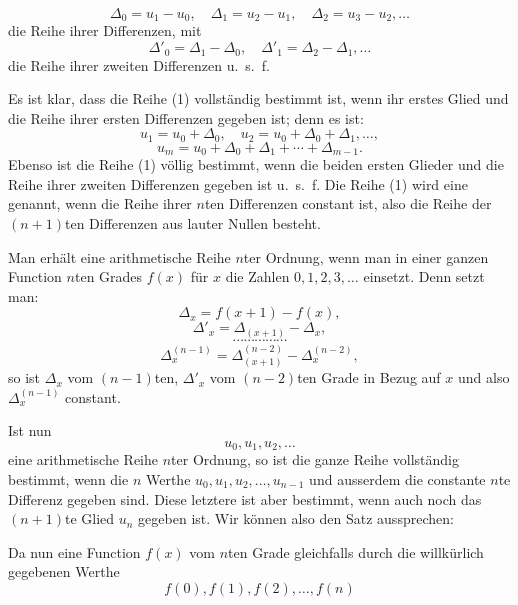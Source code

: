
\begin{equation}
\Delta_0=u_1-u_0,\quad
\Delta_1=u_2-u_1,\quad
\Delta_2=u_3-u_2,\ldots
\tag{2}
\end{equation}
die Reihe ihrer Differenzen, mit
\begin{equation}
\Delta'_0=\Delta_1-\Delta_0,\quad
\Delta'_1=\Delta_2-\Delta_1,\ldots
\tag{3}
\end{equation}
die Reihe ihrer zweiten Differenzen u.\ s.\ f.

Es ist klar, dass die Reihe (1) vollständig bestimmt ist, wenn ihr erstes Glied und die Reihe ihrer ersten Differenzen gegeben ist; denn es ist:
\[
u_1=u_0+\Delta_0,\quad
u_2=u_0+\Delta_0+\Delta_1,\ldots,
\]
\[
u_m=u_0+\Delta_0+\Delta_1+\cdots+\Delta_{m-1}.
\]
Ebenso ist die Reihe (1) völlig bestimmt, wenn die beiden ersten Glieder und die Reihe ihrer zweiten Differenzen gegeben ist u.\ s.\ f. Die Reihe (1) wird eine  genannt, wenn die Reihe ihrer $n$ten Differenzen constant ist, also die Reihe der $(n+1)$ten Differenzen aus lauter Nullen besteht.

Man erhält eine arithmetische Reihe $n$ter Ordnung, wenn man in einer ganzen Function $n$ten Grades $f(x)$ für $x$ die Zahlen $0,1,2,3,\ldots$ einsetzt. Denn setzt man:
\[
\Delta_x=f(x+1)-f(x),
\]
\[
\Delta'_x=\Delta_{(x+1)}-\Delta_x,
\]
\[
\cdots\cdots\cdots\cdots\cdots
\]
\[
\Delta_x^{(n-1)}=\Delta_{(x+1)}^{(n-2)}-\Delta_x^{(n-2)},
\]
so ist $\Delta_x$ vom $(n-1)$ten, $\Delta'_x$ vom $(n-2)$ten Grade in Bezug auf $x$ und also $\Delta_x^{(n-1)}$ constant.

Ist nun
\[
u_0,u_1,u_2,\ldots
\]
eine arithmetische Reihe $n$ter Ordnung, so ist die ganze Reihe vollständig bestimmt, wenn die $n$ Werthe $u_0,u_1,u_2,\ldots,u_{n-1}$ und ausserdem die constante $n$te Differenz gegeben sind. Diese letztere ist aber bestimmt, wenn auch noch das $(n+1)$te Glied $u_n$ gegeben ist. Wir können also den Satz aussprechen:


Da nun eine Function $f(x)$ vom $n$ten Grade gleichfalls durch die willkürlich gegebenen Werthe
\[
f(0),f(1),f(2),\ldots,f(n)
\]
